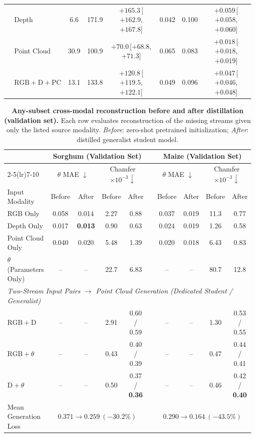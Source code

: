 \documentclass[10pt,twocolumn,letterpaper]{article}
\begin{document}
\begin{table}[t]
\begin{tabular}{l l ccc ccc}
    & Depth & 6.6 & 171.9 & $+165.3$\,{\tiny[$+162.9$, $+167.8$]} & 0.042 & 0.100 & $+0.059$\,{\tiny[$+0.058$, $+0.060$]} \\
    & Point Cloud & 30.9 & 100.9 & $+70.0$\,{\tiny[$+68.8$, $+71.3$]} & 0.065 & 0.083 & $+0.018$\,{\tiny[$+0.018$, $+0.019$]} \\
    & $\mathrm{RGB}+\mathrm{D}+\mathrm{PC}$ & 13.1 & 133.8 & $+120.8$\,{\tiny[$+119.5$, $+122.1$]} & 0.049 & 0.096 & $+0.047$\,{\tiny[$+0.046$, $+0.048$]} \\
    \bottomrule
  \end{tabular}
\end{table}

\begin{table}[t]
  \caption{\textbf{Any-subset cross-modal reconstruction before and after distillation (validation set).} Each row evaluates reconstruction of the missing streams given only the listed source modality. \emph{Before}: zero-shot pretrained initialization; \emph{After}: distilled generalist student model.}
  \label{tab:anysubset}\label{tab:main}
  \centering\scriptsize
  \setlength{\tabcolsep}{3.6pt}
  \begin{tabular}{l cc cc c cc cc}
    \toprule
    & \multicolumn{4}{c}{Sorghum (Validation Set)} & & \multicolumn{4}{c}{Maize (Validation Set)} \\
    \cmidrule(lr){2-5}\cmidrule(lr){7-10}
    & \multicolumn{2}{c}{$\theta$ MAE $\downarrow$} & \multicolumn{2}{c}{Chamfer $\times10^{-3}\downarrow$} & & \multicolumn{2}{c}{$\theta$ MAE $\downarrow$} & \multicolumn{2}{c}{Chamfer $\times10^{-3}\downarrow$} \\
    Input Modality & Before & After & Before & After & & Before & After & Before & After \\
    \midrule
    RGB Only & 0.058 & 0.014 & 2.27 & 0.88 & & 0.037 & 0.019 & 11.3 & 0.77 \\
    Depth Only & 0.017 & \textbf{0.013} & 0.90 & 0.63 & & 0.024 & 0.019 & 1.26 & 0.58 \\
    Point Cloud Only & 0.040 & 0.020 & 5.48 & 1.39 & & 0.020 & 0.018 & 6.43 & 0.83 \\
    $\theta$ (Parameters Only) & -- & -- & 22.7 & 6.83 & & -- & -- & 80.7 & 12.8 \\
    \midrule
    \multicolumn{10}{l}{\emph{Two-Stream Input Pairs $\to$ Point Cloud Generation (Dedicated Student / Generalist)}} \\
    $\mathrm{RGB}+\mathrm{D}$ & -- & -- & 2.91 & 0.60 / 0.59 & & -- & -- & 1.30 & 0.53 / 0.55 \\
    $\mathrm{RGB}+\theta$ & -- & -- & 0.43 & 0.40 / 0.39 & & -- & -- & 0.47 & 0.44 / 0.41 \\
    $\mathrm{D}+\theta$ & -- & -- & 0.50 & 0.37 / \textbf{0.36} & & -- & -- & 0.46 & 0.42 / \textbf{0.40} \\
    \midrule
    Mean Generation Loss & \multicolumn{4}{c}{$0.371 \to 0.259\ (-30.2\%)$} & & \multicolumn{4}{c}{$0.290 \to 0.164\ (-43.5\%)$} \\
    \bottomrule
  \end{tabular}
\end{table}
\end{document}
